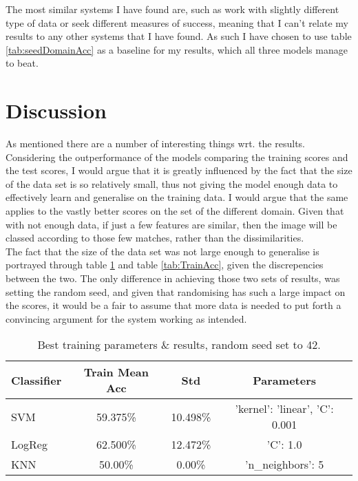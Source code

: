 \documentclass[11pt, a4paper]{article}
\begin{document}
The most similar systems I have found are, such as  work with slightly different type of data or seek different measures of success, meaning that I can't relate my results to any other systems that I have found. As such I have chosen to use table \ref{tab:seedDomainAcc} as a baseline for my results, which all three models manage to beat.\\

\section{Discussion}
As mentioned there are a number of interesting things wrt. the results. Considering the outperformance of the models comparing the training scores and the test scores, I would argue that it is greatly influenced by the fact that the size of the data set is so relatively small, thus not giving the model enough data to effectively learn and generalise on the training data. I would argue that the same applies to the vastly better scores on the set of the different domain. Given that with not enough data, if just a few features are similar, then the image will be classed according to those few matches, rather than the dissimilarities.\\
The fact that the size of the data set was not large enough to generalise is portrayed through table \ref{tab:randomSeed} and table \ref{tab:TrainAcc}, given the discrepencies between the two. The only difference in achieving those two sets of results, was setting the random seed, and given that randomising has such a large impact on the scores, it would be a fair to assume that more data is needed to put forth a convincing argument for the system working as intended.\\

\begin{table}[h]
  \centering
  \small
  \setlength\tabcolsep{2pt}
    \begin{tabular}{l|ccc}
    Classifier & Train Mean Acc & Std      & Parameters                     \\\hline
    SVM        & 59.375\%       & 10.498\% & 'kernel': 'linear', 'C': 0.001 \\
    LogReg     & 62.500\%       & 12.472\% & 'C': 1.0                       \\
    KNN        & 50.00\%        & 0.00\%   & 'n\_neighbors': 5
    \end{tabular}
    \caption{Best training parameters \& results, random seed set to 42.}
  \label{tab:randomSeed}
\end{table}
\end{document}
